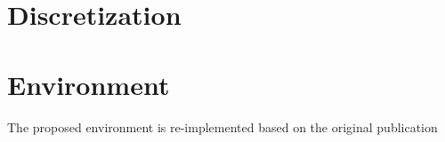 
%
%
%
%
%
%
\section{Discretization}
%
%
\section{Environment}

The proposed environment is re-implemented based on the original publication


